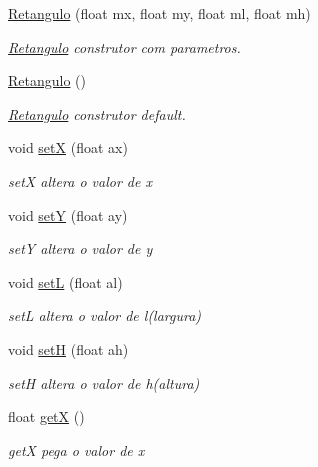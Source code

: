 \begin{DoxyCompactItemize}
\item 
\hyperlink{classRetangulo_a0adc62d138f47213cf87d586e5a6696a}{Retangulo} (float mx, float my, float ml, float mh)
\begin{DoxyCompactList}\small\item\em \hyperlink{classRetangulo}{Retangulo} construtor com parametros. \end{DoxyCompactList}\item 
\hyperlink{classRetangulo_ac21a81cae046920c8bee401bcb879562}{Retangulo} ()\hypertarget{classRetangulo_ac21a81cae046920c8bee401bcb879562}{}\label{classRetangulo_ac21a81cae046920c8bee401bcb879562}

\begin{DoxyCompactList}\small\item\em \hyperlink{classRetangulo}{Retangulo} construtor default. \end{DoxyCompactList}\item 
void \hyperlink{classRetangulo_ae8f1addf1aa58db6bb7ecdacf24cf8b5}{setX} (float ax)
\begin{DoxyCompactList}\small\item\em setX altera o valor de x \end{DoxyCompactList}\item 
void \hyperlink{classRetangulo_a33dc14f360717587910402086d0e41ec}{setY} (float ay)
\begin{DoxyCompactList}\small\item\em setY altera o valor de y \end{DoxyCompactList}\item 
void \hyperlink{classRetangulo_a5c3c6a3b23021c98fa59d8e33ae98f5d}{setL} (float al)
\begin{DoxyCompactList}\small\item\em setL altera o valor de l(largura) \end{DoxyCompactList}\item 
void \hyperlink{classRetangulo_a873a695a170f2101e5b2318096a5b132}{setH} (float ah)
\begin{DoxyCompactList}\small\item\em setH altera o valor de h(altura) \end{DoxyCompactList}\item 
float \hyperlink{classRetangulo_ab75dcae43c0c9b632843b2085f8bd118}{getX} ()
\begin{DoxyCompactList}\small\item\em getX pega o valor de x \end{DoxyCompactList}\item 

\end{DoxyCompactItemize}
